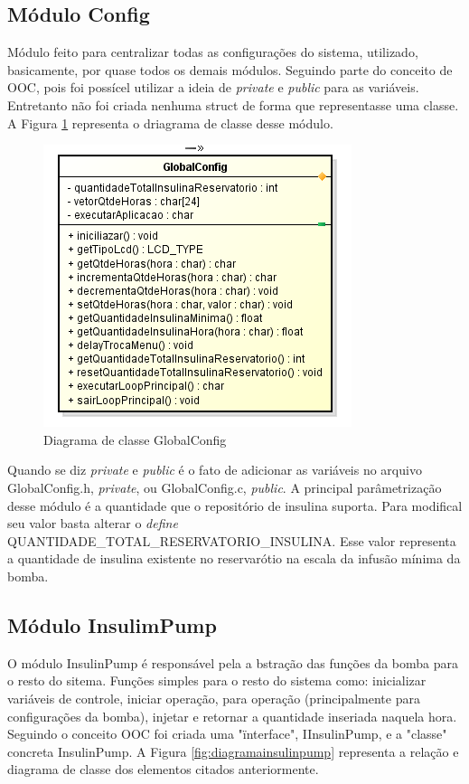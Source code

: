 \subsection{Módulo Config}

Módulo feito para centralizar todas as configurações do sistema, utilizado, basicamente, por quase todos os demais módulos. Seguindo parte do conceito de OOC, pois foi possícel utilizar a ideia de \emph{private} e \emph{public} para as variáveis. Entretanto não foi criada nenhuma struct de forma que representasse uma classe. A Figura \ref{fig:driagramaclasseconfig} representa o driagrama de classe desse módulo.


\begin{figure}[htp]
	\centering
	\includegraphics[scale=1]{images/classe_GlobalConfig.png}
	\caption{Diagrama de classe GlobalConfig}	
	\label{fig:driagramaclasseconfig}
\end{figure}

Quando se diz \emph{private} e \emph{public} é o fato de adicionar as variáveis no arquivo GlobalConfig.h, \emph{private}, ou GlobalConfig.c, \emph{public}. A principal parâmetrização desse módulo é a quantidade que o repositório de insulina suporta. Para modifical seu valor basta alterar o \emph{define} QUANTIDADE\_TOTAL\_RESERVATORIO\_INSULINA. Esse valor representa a quantidade de insulina existente no reservarótio na escala da infusão mínima da bomba.

\subsection{Módulo InsulimPump}

O módulo InsulinPump é responsável pela a bstração das funções da bomba para o resto do sitema. Funções simples para o resto do sistema como: inicializar variáveis de controle, iniciar operação, para operação (principalmente para configurações da bomba), injetar e retornar a quantidade inseriada naquela hora. Seguindo o conceito OOC foi criada uma "ïnterface", IInsulinPump, e a "classe" concreta InsulinPump. A Figura \ref{fig:diagramainsulinpump} representa a relação e diagrama de classe dos elementos citados anteriormente.

